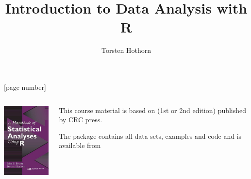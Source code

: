 \title{Introduction to Data Analysis with \textsf{R}}
\author[T. Hothorn]{Torsten Hothorn}

\date{}



\frame{\titlepage}

[page number]

\begin{frame}[fragile]

    \begin{columns}

       \begin{column}{3.5cm}
           \includegraphics[width = 3cm]{graphics/HSAUR}
       \end{column}

       \begin{column}{7.5cm}

           This course material is based on 
           (1st or 2nd edition) published by CRC press. 

           The \R{} package  contains all data sets, 
           examples and \R{} code and is available from 
       \end{column}
    \end{columns}

\end{frame}


